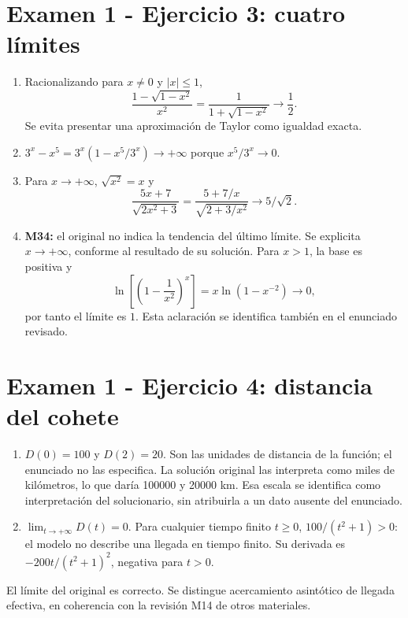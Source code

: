 \documentclass[11pt]{article}
\begin{document}
\section*{Examen 1 - Ejercicio 3: cuatro límites}
\begin{enumerate}[label=(\alph*)]
\item Racionalizando para $x\ne0$ y $|x|\leq1$,
\[
\frac{1-\sqrt{1-x^2}}{x^2}=\frac1{1+\sqrt{1-x^2}}\longrightarrow\boxed{\frac12}.
\]
Se evita presentar una aproximación de Taylor como igualdad exacta.
\item $3^x-x^5=3^x(1-x^5/3^x)\to\boxed{+\infty}$ porque $x^5/3^x\to0$.
\item Para $x\to+\infty$, $\sqrt{x^2}=x$ y
\[
\frac{5x+7}{\sqrt{2x^2+3}}=\frac{5+7/x}{\sqrt{2+3/x^2}}\to\boxed{5/\sqrt2}.
\]
\item \textbf{M34:} el original no indica la tendencia del último límite. Se explicita $x\to+\infty$, conforme al resultado de su solución. Para $x>1$, la base es positiva y
\[
\ln\left[\left(1-\frac1{x^2}\right)^x\right]
=x\ln(1-x^{-2})\to0,
\]
por tanto el límite es $\boxed1$. Esta aclaración se identifica también en el enunciado revisado.
\end{enumerate}
\clearpage
\section*{Examen 1 - Ejercicio 4: distancia del cohete}
\begin{enumerate}[label=(\alph*)]
\item $\boxed{D(0)=100}$ y $\boxed{D(2)=20}$. Son las unidades de distancia de la función; el enunciado no las especifica. La solución original las interpreta como miles de kilómetros, lo que daría 100000 y 20000 km. Esa escala se identifica como interpretación del solucionario, sin atribuirla a un dato ausente del enunciado.
\item $\boxed{\lim_{t\to+\infty}D(t)=0}$. Para cualquier tiempo finito $t\geq0$, $100/(t^2+1)>0$: el modelo no describe una llegada en tiempo finito. Su derivada es $-200t/(t^2+1)^2$, negativa para $t>0$.
\end{enumerate}
El límite del original es correcto. Se distingue acercamiento asintótico de llegada efectiva, en coherencia con la revisión M14 de otros materiales.
\clearpage
\end{document}
